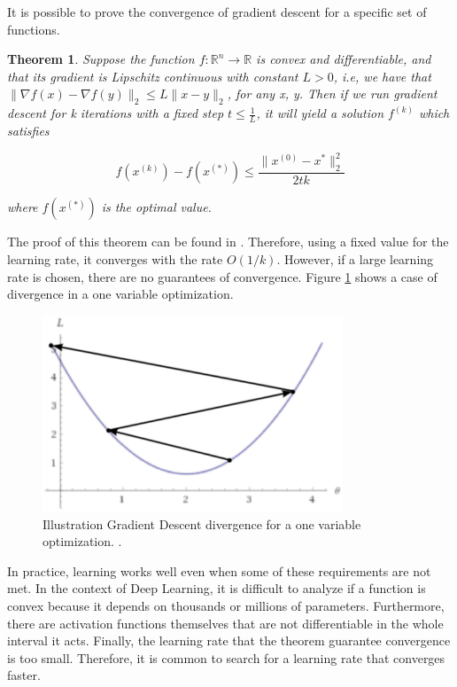 It is possible to prove the convergence of gradient descent for a specific set of functions.

\newtheorem{gdconv}{Theorem}\label{proof:gdconv}
\begin{gdconv}
	Suppose the function $f : \mathbb{R}^{n} \rightarrow \mathbb{R}$ is convex and differentiable, and that its gradient is Lipschitz continuous with constant $L > 0$, i.e, we have that $\lVert \nabla f(x) - \nabla f(y) \rVert_{2} \leq L\lVert x - y \rVert_{2}$, for any x, y. Then if we run gradient descent for k iterations with a fixed step $t \leq \frac{1}{L}$, it will yield a solution $f^{(k)}$ which satisfies
	
	\begin{equation}
		f(x^{(k)}) - f(x^{(*)}) \leq \frac{\lVert x^{(0)} - x^{*} \rVert^{2}_{2}}{2tk} 
	\end{equation}
	
	where $f(x^{(*)})$ is the optimal value.
\end{gdconv}

The proof of this theorem can be found in \cite{tibshirani2013}. Therefore, using a fixed value for the learning rate, it converges with the rate $O(1/k)$. However, if a large learning rate is chosen, there are no guarantees of convergence. Figure \ref{fig:gddivergence} shows a case of divergence in a one variable optimization.


\begin{figure}[!htbp]
	\centering
	\includegraphics[width=0.8\textwidth]{Cap3/gddivergence.eps}
	\caption{ Illustration Gradient Descent divergence for a one variable optimization.
		\cite{tgilharco}.
	}
	\label{fig:gddivergence}
\end{figure}

In practice, learning works well even when some of these requirements are not met. In the context of Deep Learning, it is difficult to analyze if a function is convex because it depends on thousands or millions of parameters. Furthermore, there are activation functions themselves that are not differentiable in the whole interval it acts. Finally, the learning rate that the theorem guarantee convergence is too small. Therefore, it is common to search for a learning rate that converges faster. 

